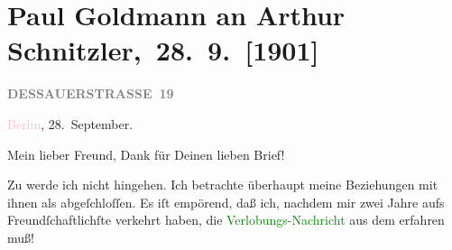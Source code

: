 

\renewcommand{\erwaehntePersonen}{Personen: Marie Glümer, Auguste Glümer, Maxim Gorkij, Paul Martin Marton, Olga Schnitzler, Elisabeth Steinrück}
\renewcommand{\erwaehnteOrte}{Orte: Berlin, Dessauer Straße, Russland, Salzburg, Wien}
\renewcommand{\erwaehnteWerke}{Werke: Berliner Lokal-Anzeiger, Die neueste Verlobung in Berliner Theaterkreisen, [Artikel über eine russische Judenverfolgung]}
\section[ Paul Goldmann an Arthur Schnitzler, 28. 9. {[}1901{]}]{Paul Goldmann an Arthur Schnitzler, 28. 9. {[}1901{]}}
\nopagebreak{}
\rehead{ }\normalsize\beginnumbering{}
\toendnotes[C]{\smallbreak\pagebreak[2]}
\toendnotes[C]{\smallbreak}
\pstart
           \noindent{}\raggedleft{}{\pb}\textcolor{pink}{\textcolor{gray}{\textbf{DESSAUERSTRASSE 19}}}{}\ledrightnote{\textcolor{pink}{Dessauer Straße}}\pend
           
\pstart
           \textcolor{pink}{Berlin}{}\ledrightnote{\textcolor{pink}{Berlin}}, 28. September.\pend
           
\pstart\center{}Mein lieber Freund,\pend
\pstart
           Dank für Deinen lieben Brief!\pend
           
\pstart
           Zu \label{K_L03087-1v}\label{K_L03087-1h} werde ich nicht hingehen. Ich betrachte überhaupt meine Beziehungen mit ihnen
               als abgeſchloſſen. Es iſt empörend, daß ich, nachdem mir zwei Jahre aufs
               Freundſchaftlichſte verkehrt haben, die \textcolor{green}{Verlobungs-Nachricht}{}\ledrightnote{{$\rightarrow$}\textcolor{green}{Die neueste Verlobung in Berliner Theaterkreisen}} aus dem \label{K_L03087-2v}\label{K_L03087-2h} erfahren
               muß!\pend
           
